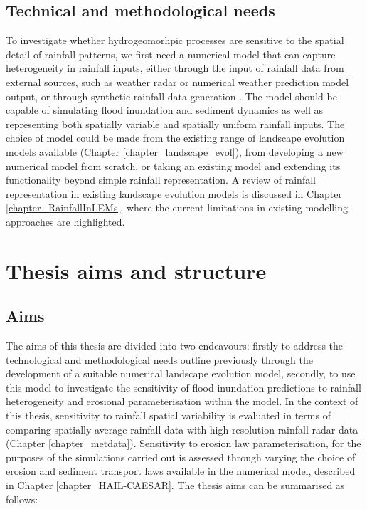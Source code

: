 \subsection{Technical and methodological needs}
To investigate whether hydrogeomorhpic processes are sensitive to the spatial detail of rainfall patterns, we first need a numerical model that can capture heterogeneity in rainfall inputs, either through the input of rainfall data from external sources, such as weather radar or numerical weather prediction model output, or through synthetic rainfall data generation \citep[e.g.][]{Peleg2014}. The model should be capable of simulating flood inundation and sediment dynamics as well as representing both spatially variable and spatially uniform rainfall inputs. The choice of model could be made from the existing range of landscape evolution models available (Chapter \ref{chapter_landscape_evol}), from developing a new numerical model from scratch, or taking an existing model and extending its functionality beyond simple rainfall representation. A review of rainfall representation in existing landscape evolution models is discussed in Chapter \ref{chapter_RainfallInLEMs}, where the current limitations in existing modelling approaches are highlighted. 


\section{Thesis aims and structure}
\subsection{Aims}
The aims of this thesis are divided into two endeavours: firstly to address the technological and methodological needs outline previously through the development of a suitable numerical landscape evolution model, secondly, to use this model to investigate the sensitivity of flood inundation predictions to rainfall heterogeneity and erosional parameterisation within the model. In the context of this thesis, sensitivity to rainfall spatial variability is evaluated in terms of comparing spatially average rainfall data with high-resolution rainfall radar data (Chapter \ref{chapter_metdata}). Sensitivity to erosion law parameterisation, for the purposes of the simulations carried out is assessed through varying the choice of erosion and sediment transport laws available in the numerical model, described in Chapter \ref{chapter_HAIL-CAESAR}. The thesis aims can be summarised as follows:

